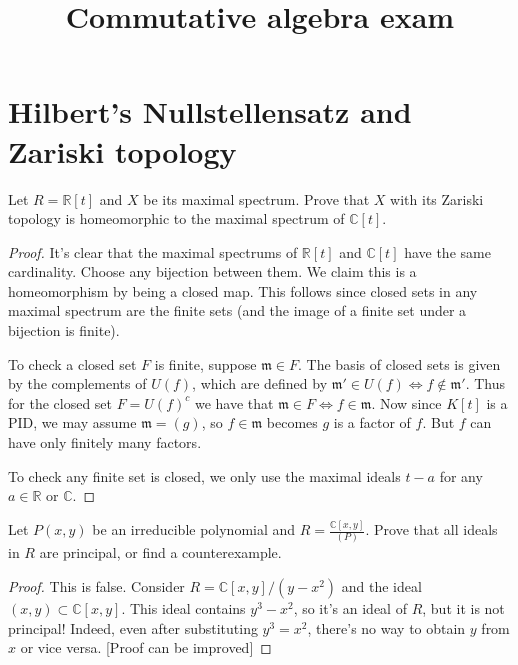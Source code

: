



\title{Commutative algebra exam}
\maketitle

\section{Hilbert's Nullstellensatz
and Zariski topology}

\begin{exercise}
\label{exercise-maximal-spectrum}
Let $R=\mathbb{R}[t]$ and $X$ be its
maximal spectrum. Prove that $X$ with its
Zariski topology is homeomorphic
to the maximal spectrum of $\mathbb{C}[t]$.
\end{exercise}

\begin{proof}
It's clear that
the maximal spectrums of $\mathbb{R}[t]$
and $\mathbb{C}[t]$ have the same
cardinality. Choose any bijection between
them. We claim this is a homeomorphism
by being a closed map. This follows
since closed sets in any maximal spectrum
are the finite sets (and the
image of a finite set under
a bijection is finite).

To check a closed set $F$ is finite,
suppose $\mathfrak{m} \in F$.
The basis of closed sets is given
by the complements of $U(f)$,
which are defined by
$\mathfrak{m}' \in U(f) \iff
f \not\in \mathfrak{m}'$.
Thus for the closed set $F=U(f)^c$
we have that $\mathfrak{m} \in F
\iff f \in \mathfrak{m}$.
Now since $K[t]$ is a PID,
we may assume $\mathfrak{m}=(g)$,
so $f \in \mathfrak{m}$ becomes
$g$ is a factor of $f$.
But $f$ can have only finitely many factors.

To check any finite set is closed, we
only use the maximal ideals
$t-a$ for any $a \in \mathbb{R}$ or
$\mathbb{C}$.
\end{proof}

\begin{exercise}
\label{exercise-ring-of-plane-curve-is-pid}
Let $P(x,y)$ be an irreducible polynomial
and $R = \frac{\mathbb{C}[x,y]}{(P)}$.
Prove that all ideals in $R$ are
principal, or find a counterexample.
\end{exercise}

\begin{proof}
This is false. Consider
$R=\mathbb{C}[x,y]/(y-x^2)$
and the ideal $(x,y) \subset
\mathbb{C}[x,y]$.
This ideal contains $y^3-x^2$,
so it's an ideal of $R$,
but it is not principal!
Indeed, even after substituting $y^3=x^2$,
there's no way to obtain $y$ from $x$
or vice versa. [Proof can be improved]
\end{proof}


